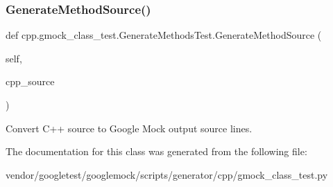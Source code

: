 \subsubsection{\texorpdfstring{Generate\+Method\+Source()}{GenerateMethodSource()}}
{\footnotesize\ttfamily def cpp.\+gmock\+\_\+class\+\_\+test.\+Generate\+Methods\+Test.\+Generate\+Method\+Source (\begin{DoxyParamCaption}\item[{}]{self,  }\item[{}]{cpp\+\_\+source }\end{DoxyParamCaption})}

\begin{DoxyVerb}Convert C++ source to Google Mock output source lines.\end{DoxyVerb}
 

The documentation for this class was generated from the following file\+:\begin{DoxyCompactItemize}
\item 
vendor/googletest/googlemock/scripts/generator/cpp/gmock\+\_\+class\+\_\+test.\+py\end{DoxyCompactItemize}
